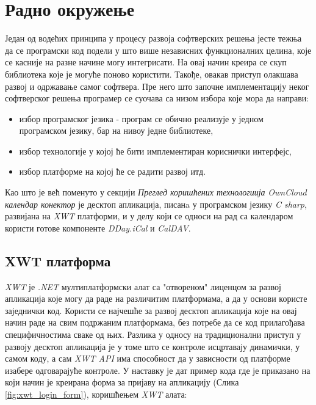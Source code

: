 \chapter{Радно окружење}
\label{chap:Radno okruzenje}

Један од водећих принципа у процесу развоја софтверских решења јесте тежња да се програмски код подели у што више независних функционалних целина, које се касније на разне начине могу интегрисати. На овај начин креира се скуп библиотека које је могуће поново користити. Такође, овакав приступ олакшава развој и одржавање самог софтвера. Пре него што започне имплементацију неког софтверског решења програмер се суочава са низом избора које мора да направи:
\begin{itemize}
	\item {избор програмског језика - програм се обично реализује у једном програмском језику, бар на нивоу једне библиотеке},
	\item {избор технологије у којој ће бити имплементиран кориснички интерфејс},
	\item {избор платформе на којој ће се радити развој итд.} 
\end{itemize}

Као што је већ поменуто у секцији \textit{Преглед коришћених технологиија} \textit{OwnCloud календар конектор} је десктоп апликација, писанa у програмском језику \textit{C sharp}, развијана на \textit{XWT} платформи, и у делу који се односи на рад са календаром користи готове компоненте \textit{DDay.iCal} и \textit{CalDAV}.

\section {XWT платформа}

\textit{XWT} је \textit{.NET} мултиплатформски алат са "отвореном" лиценцом за развој апликација које могу да раде на различитим платформама, а да у основи користе заједнички код. Користи се најчешће за развој десктоп апликација које на овај начин раде на свим подржаним платформама, без потребе да се код прилагођава специфичностима сваке од њих. Разлика у односу на традиционални приступ у развоју десктоп апликација је у томе што се контроле исцртавају динамички, у самом коду, а сам \textit{XWT API} има способност да у зависности од платформе изабере одговарајуће контроле. У наставку је дат пример кода где је приказано на који начин је креирана форма за пријаву на апликацију (Слика \ref{fig:xwt_login_form}), коришћењем \textit{XWT} алата:


